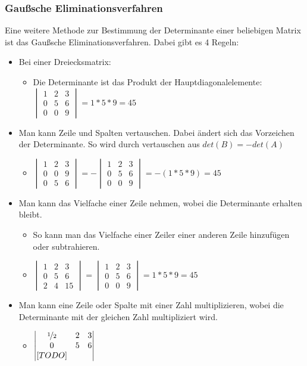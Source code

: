 \documentclass{article}
\begin{document}
	\subsubsection{Gaußsche Eliminationsverfahren}
	Eine weitere Methode zur Bestimmung der Determinante einer beliebigen Matrix ist das Gaußsche Eliminationsverfahren. Dabei gibt es 4 Regeln:
	\begin{itemize}
		\item{Bei einer Dreiecksmatrix:}
		\begin{itemize}
			\item{Die Determinante ist das Produkt der Hauptdiagonalelemente: $\begin{vmatrix} 1 & 2 & 3 \\ 0 & 5 & 6 \\ 0 & 0 & 9 \end{vmatrix}=1*5*9=45$}
		\end{itemize}
		\item{Man kann Zeile und Spalten vertauschen. Dabei ändert sich das Vorzeichen der Determinante. So wird durch vertauschen aus $det(B)=-det(A)$}
		\begin{itemize}
			\item{$\begin{vmatrix} 1 & 2 & 3 \\ 0 & 0 & 9 \\ 0 & 5 & 6 \end{vmatrix}=-\begin{vmatrix} 1 & 2 & 3 \\ 0 & 5 & 6 \\ 0 & 0 & 9 \end{vmatrix}=-(1*5*9)=45$}
		\end{itemize}
		\item{Man kann das Vielfache einer Zeile nehmen, wobei die Determinante erhalten bleibt.}
		\begin{itemize}
			\item{So kann man das Vielfache einer Zeiler einer anderen Zeile hinzufügen oder subtrahieren.}
			\item{$\begin{vmatrix} 1 & 2 & 3 \\ 0 & 5 & 6 \\ 2 & 4 & 15 \end{vmatrix}=\begin{vmatrix} 1 & 2 & 3 \\ 0 & 5 & 6 \\ 0 & 0 & 9 \end{vmatrix}=1*5*9=45$}
		\end{itemize}
		\item{Man kann eine Zeile oder Spalte mit einer Zahl multiplizieren, wobei die Determinante mit der gleichen Zahl multipliziert wird.}
		\begin{itemize}
			\item{$\begin{vmatrix} \nicefrac{1}{2} & 2 & 3 \\ 0 & 5 & 6 \\  [TODO] & & \end{vmatrix}$}
		\end{itemize}
	\end{itemize}
\end{document}
